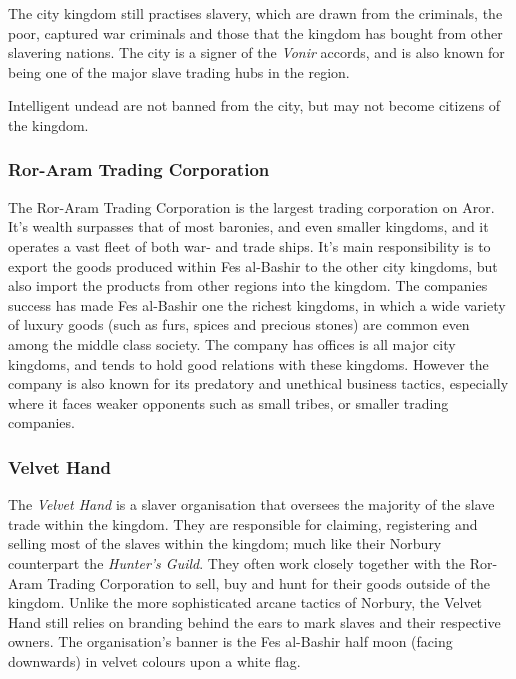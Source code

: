 The city kingdom still practises slavery, which are drawn from the criminals,
the poor, captured war criminals and those that the kingdom has bought from
other slavering nations. The city is a signer of the \emph{Vonir} accords, and
is also known for being one of the major slave trading hubs in the region.

Intelligent undead are not banned from the city, but may not become citizens
of the kingdom.

\subsubsection*{Ror-Aram Trading Corporation}
\label{sec:Ror-Aram Trading Corporation}

The Ror-Aram Trading Corporation is the largest trading corporation on Aror.
It's wealth surpasses that of most baronies, and even smaller kingdoms, and it
operates a vast fleet of both war- and trade ships. It's main responsibility is
to export the goods produced within Fes al-Bashir to the other city kingdoms,
but also import the products from other regions into the kingdom. The
companies success has made Fes al-Bashir one the richest kingdoms, in which a
wide variety of luxury goods (such as furs, spices and precious stones) are
common even among the middle class society. The company has offices is all
major city kingdoms, and tends to hold good relations with these
kingdoms. However the company is also known for its predatory and unethical
business tactics, especially where it faces weaker opponents such as small
tribes, or smaller trading companies.

\subsubsection*{Velvet Hand}
\label{sec:Velvet Hand}

The \emph{Velvet Hand} is a slaver organisation that oversees the majority of
the slave trade within the kingdom. They are responsible for claiming,
registering and selling most of the slaves within the kingdom; much like their
Norbury counterpart the \emph{Hunter's Guild}. They often work closely
together with the Ror-Aram Trading Corporation to sell, buy and hunt for their
goods outside of the kingdom. Unlike the more sophisticated arcane tactics of
Norbury, the Velvet Hand still relies on branding behind the ears to mark
slaves and their respective owners. The organisation's banner is the Fes
al-Bashir half moon (facing downwards) in velvet colours upon a white flag.

